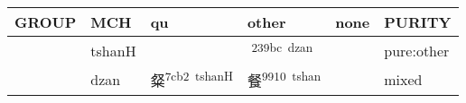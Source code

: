 \documentclass[14pt,a4paper]{scrartcl}
\begin{document}
\begin{longtable}[c]{@{}llllll@{}}
\toprule
\begin{minipage}[b]{0.14\columnwidth}\raggedright\strut
GROUP
\strut\end{minipage} &
\begin{minipage}[b]{0.14\columnwidth}\raggedright\strut
MCH
\strut\end{minipage} &
\begin{minipage}[b]{0.14\columnwidth}\raggedright\strut
qu
\strut\end{minipage} &
\begin{minipage}[b]{0.14\columnwidth}\raggedright\strut
other
\strut\end{minipage} &
\begin{minipage}[b]{0.14\columnwidth}\raggedright\strut
none
\strut\end{minipage} &
\begin{minipage}[b]{0.14\columnwidth}\raggedright\strut
PURITY
\strut\end{minipage}\tabularnewline
\midrule
\endhead
\begin{minipage}[t]{0.14\columnwidth}\raggedright\strut
𣦵
\strut\end{minipage} &
\begin{minipage}[t]{0.14\columnwidth}\raggedright\strut
tshanH
\strut\end{minipage} &
\begin{minipage}[t]{0.14\columnwidth}\raggedright\strut
\strut\end{minipage} &
\begin{minipage}[t]{0.14\columnwidth}\raggedright\strut
𣦼\textsuperscript{239bc~dzan}
\strut\end{minipage} &
\begin{minipage}[t]{0.14\columnwidth}\raggedright\strut
\strut\end{minipage} &
\begin{minipage}[t]{0.14\columnwidth}\raggedright\strut
pure:other
\strut\end{minipage}\tabularnewline
\begin{minipage}[t]{0.14\columnwidth}\raggedright\strut
𣦼
\strut\end{minipage} &
\begin{minipage}[t]{0.14\columnwidth}\raggedright\strut
dzan
\strut\end{minipage} &
\begin{minipage}[t]{0.14\columnwidth}\raggedright\strut
粲\textsuperscript{7cb2~tshanH}
\strut\end{minipage} &
\begin{minipage}[t]{0.14\columnwidth}\raggedright\strut
餐\textsuperscript{9910~tshan}
\strut\end{minipage} &
\begin{minipage}[t]{0.14\columnwidth}\raggedright\strut
\strut\end{minipage} &
\begin{minipage}[t]{0.14\columnwidth}\raggedright\strut
mixed
\strut\end{minipage}\tabularnewline
\bottomrule
\end{longtable}
\end{document}
